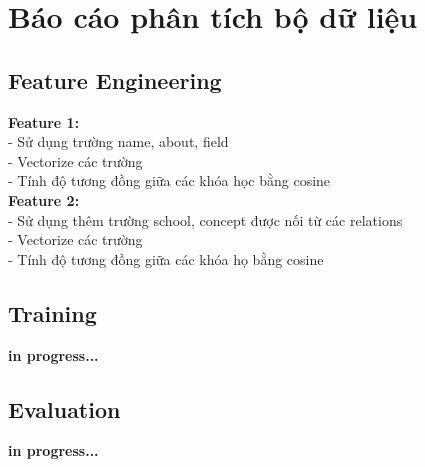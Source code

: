 \section{Báo cáo phân tích bộ dữ liệu}
\subsection{Feature Engineering}
\textbf{Feature 1:}\\
- Sử dụng trường name, about, field\\
- Vectorize các trường\\
- Tính độ tương đồng giữa các khóa học bằng cosine\\
\textbf{Feature 2:}\\
- Sử dụng thêm trường school, concept được nối từ các relations\\
- Vectorize các trường\\
- Tính độ tương đồng giữa các khóa họ bằng cosine
\subsection{Training}
\textbf{in progress...}
\subsection{Evaluation}
\textbf{in progress...}\\
